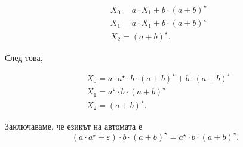 \begin{align*}
  & X_0 = a \cdot X_1 + b \cdot (a+b)^\star\\
  & X_1 = a \cdot X_1 + b \cdot (a+b)^\star\\
  & X_2 = (a+b)^\star.
\end{align*}

След това,

\begin{align*}
  & X_0 = a \cdot a^\star \cdot b \cdot (a+b)^\star + b \cdot (a+b)^\star\\
  & X_1 = a^\star \cdot b \cdot (a+b)^\star\\
  & X_2 = (a+b)^\star.
\end{align*}

Заключаваме, че езикът на автомата е
\[(a \cdot a^\star + \varepsilon) \cdot b \cdot (a+b)^\star = a^\star \cdot b \cdot (a+b)^\star.\]


